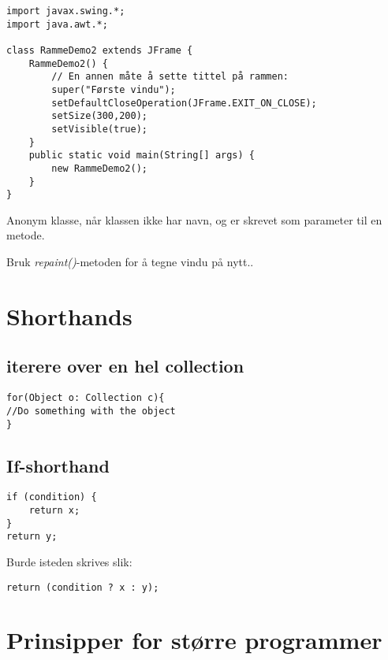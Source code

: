 \documentclass[11pt]{article}
\begin{document}
\begin{verbatim}
import javax.swing.*; 
import java.awt.*;

class RammeDemo2 extends JFrame { 
    RammeDemo2() {
        // En annen måte å sette tittel på rammen:
        super("Første vindu");                     
        setDefaultCloseOperation(JFrame.EXIT_ON_CLOSE);
        setSize(300,200);        
        setVisible(true);
    } 
    public static void main(String[] args) {
        new RammeDemo2();
    }
}
\end{verbatim}

Anonym klasse, når klassen ikke har navn, og er skrevet som parameter
til en metode.

Bruk \emph{repaint()}-metoden for å tegne vindu på nytt..
\section{Shorthands}
\label{sec-20}
\subsection{iterere over en hel collection}
\label{sec-20-1}


\begin{verbatim}
for(Object o: Collection c){
//Do something with the object
}
\end{verbatim}
\subsection{If-shorthand}
\label{sec-20-2}



\begin{verbatim}
if (condition) {
    return x;
}
return y;
\end{verbatim}

Burde isteden skrives slik:


\begin{verbatim}
return (condition ? x : y);
\end{verbatim}
\section{Prinsipper for større programmer}
\label{sec-21}
\end{document}
